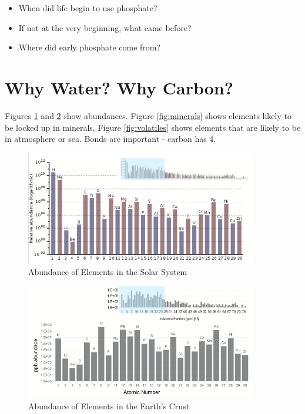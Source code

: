 \documentclass[]{article}
\begin{document}
\begin{itemize}
	\item When did life begin to use 	phosphate?
	\item If not at the very beginning, what 	came before?
	\item Where did early phosphate come 	from?
\end{itemize}

\section{Why Water? Why Carbon?}
Figures \ref{fig:abundances1} and \ref{fig:abundances2} show abundances. Figure \ref{fig:minerals} shows elements likely to be locked up in minerals, Figure \ref{fig:volatiles} shows elements that are likely to be in atmosphere or sea. Bonds are important - carbon has 4.

\begin{figure}[H]
	\caption{Abundance of Elements in the Solar System}\label{fig:abundances1} 
	\includegraphics[width=0.9\textwidth]{Abundances}
\end{figure}

\begin{figure}[H]
	\caption{Abundance of Elements in the Earth's Crust}\label{fig:abundances2}  
	\includegraphics[width=0.9\textwidth]{AbundancesEarth}
\end{figure}
\end{document}
